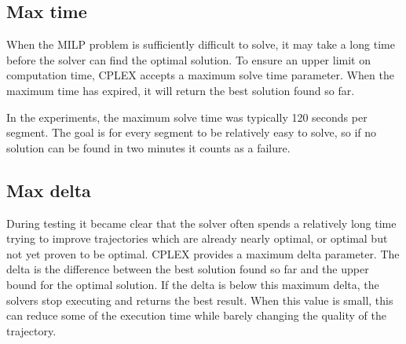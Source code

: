 \subsection{Max time}
When the MILP problem is sufficiently difficult to solve, it may take a long time before the solver can find the optimal solution. To ensure an upper limit on computation time, CPLEX accepts a maximum solve time parameter. When the maximum time has expired, it will return the best solution found so far.
\par
In the experiments, the maximum solve time was typically 120 seconds per segment. The goal is for every segment to be relatively easy to solve, so if no solution can be found in two minutes it counts as a failure.
\subsection{Max delta}
During testing it became clear that the solver often spends a relatively long time trying to improve trajectories which are already nearly optimal, or optimal but not yet proven to be optimal. CPLEX provides a maximum delta parameter. The delta is the difference between the best solution found so far and the upper bound for the optimal solution. If the delta is below this maximum delta, the solvers stop executing and returns the best result. When this value is small, this can reduce some of the execution time while barely changing the quality of the trajectory.


